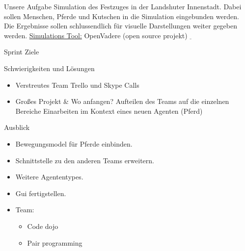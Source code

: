 \newcommand\tab[1][1cm]{\hspace*{#1}}
\graphicspath{{images/}{images/logos/}}
\begin{frame}{Unsere Aufgabe}
	Simulation des Festzuges in der Landshuter Innenstadt.
	Dabei sollen Menschen, Pferde und Kutschen in die Simulation eingebunden werden.
	Die Ergebnisse sollen schlussendlich für visuelle Darstellungen weiter gegeben werden.
	\newline \newline
	\underline{Simulations Tool:} \newline \tab OpenVadere (open source projekt) $\underline{}$
\end{frame}

\begin{frame}{Sprint Ziele}
	\begin{center}
	\end{center}
\end{frame}

\begin{frame}{Schwierigkeiten und Lösungen}
	\begin{itemize}
		\item Verstreutes Team \newline \tab Trello und Skype Calls
		\item Großes Projekt \& Wo anfangen?
			 \newline \tab Aufteilen des Teams auf die einzelnen Bereiche
			 \newline \tab Einarbeiten im Kontext eines neuen Agenten (Pferd)
	\end{itemize}
\end{frame}

\begin{frame}{Ausblick}
	\begin{itemize}
		\item Bewegungsmodel für Pferde einbinden.
		\item Schnittstelle zu den anderen Teams erweitern.
		\item Weitere Agententypes.
		\item Gui fertigstellen.
		\item Team:
			\begin{itemize}
				\item Code dojo
				\item Pair programming
			\end{itemize}
	\end{itemize}
\end{frame}
